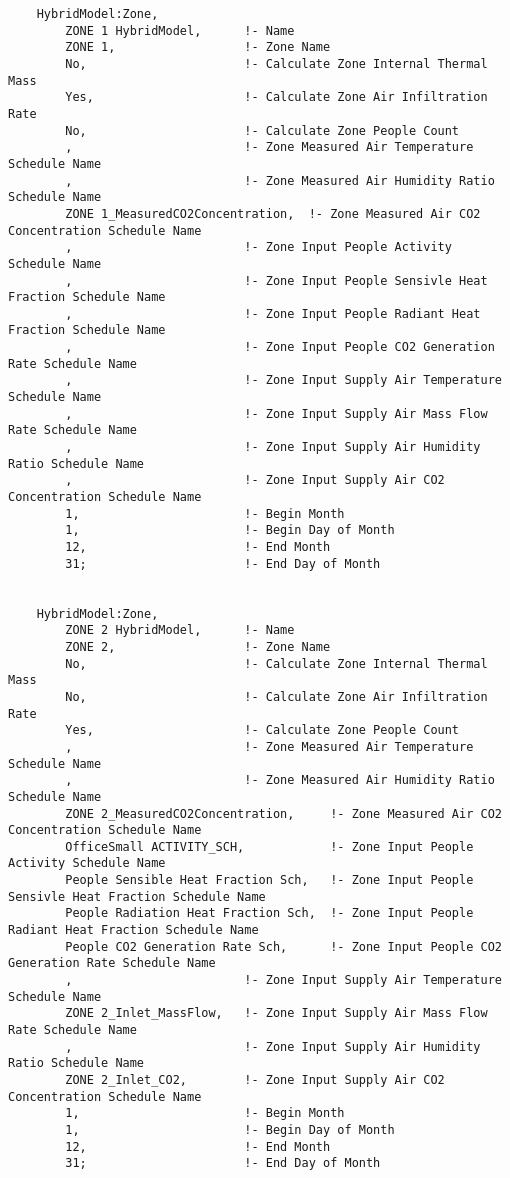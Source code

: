 \begin{lstlisting}
    HybridModel:Zone,
        ZONE 1 HybridModel,      !- Name
        ZONE 1,                  !- Zone Name
        No,                      !- Calculate Zone Internal Thermal Mass
        Yes,                     !- Calculate Zone Air Infiltration Rate
        No,                      !- Calculate Zone People Count
        ,                        !- Zone Measured Air Temperature Schedule Name
        ,                        !- Zone Measured Air Humidity Ratio Schedule Name
        ZONE 1_MeasuredCO2Concentration,  !- Zone Measured Air CO2 Concentration Schedule Name
        ,                        !- Zone Input People Activity Schedule Name
        ,                        !- Zone Input People Sensivle Heat Fraction Schedule Name
        ,                        !- Zone Input People Radiant Heat Fraction Schedule Name
        ,                        !- Zone Input People CO2 Generation Rate Schedule Name
        ,                        !- Zone Input Supply Air Temperature Schedule Name
        ,                        !- Zone Input Supply Air Mass Flow Rate Schedule Name
        ,                        !- Zone Input Supply Air Humidity Ratio Schedule Name
        ,                        !- Zone Input Supply Air CO2 Concentration Schedule Name
        1,                       !- Begin Month
        1,                       !- Begin Day of Month
        12,                      !- End Month
        31;                      !- End Day of Month


    HybridModel:Zone,
        ZONE 2 HybridModel,      !- Name
        ZONE 2,                  !- Zone Name
        No,                      !- Calculate Zone Internal Thermal Mass
        No,                      !- Calculate Zone Air Infiltration Rate
        Yes,                     !- Calculate Zone People Count
        ,                        !- Zone Measured Air Temperature Schedule Name
        ,                        !- Zone Measured Air Humidity Ratio Schedule Name
        ZONE 2_MeasuredCO2Concentration,     !- Zone Measured Air CO2 Concentration Schedule Name
        OfficeSmall ACTIVITY_SCH,            !- Zone Input People Activity Schedule Name
        People Sensible Heat Fraction Sch,   !- Zone Input People Sensivle Heat Fraction Schedule Name
        People Radiation Heat Fraction Sch,  !- Zone Input People Radiant Heat Fraction Schedule Name
        People CO2 Generation Rate Sch,      !- Zone Input People CO2 Generation Rate Schedule Name
        ,                        !- Zone Input Supply Air Temperature Schedule Name
        ZONE 2_Inlet_MassFlow,   !- Zone Input Supply Air Mass Flow Rate Schedule Name
        ,                        !- Zone Input Supply Air Humidity Ratio Schedule Name
        ZONE 2_Inlet_CO2,        !- Zone Input Supply Air CO2 Concentration Schedule Name
        1,                       !- Begin Month
        1,                       !- Begin Day of Month
        12,                      !- End Month
        31;                      !- End Day of Month

\end{lstlisting}


